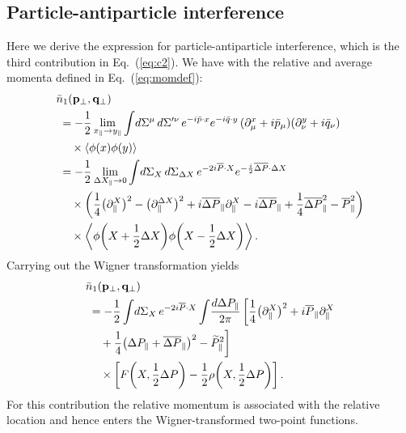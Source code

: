 \documentclass[reprint,superscriptaddress,english,preprintnumbers,amsmath,amssymb,aps,prx]{revtex4-2}
\def\Eq#1{Eq.~(\ref{#1})}
\begin{document}
\begin{appendix}


\section{Particle-antiparticle interference}\label{app:pai}

Here we derive the expression for particle-antiparticle interference, which is the third contribution in \Eq{eq:c2}. We have with the relative and average momenta defined in \Eq{eq:momdef}:
\begin{align}
\begin{split}
&\bar n_1(\bold{p}_\perp,\bold{q}_\perp)\\
&\;= - \frac{1}{2}\lim_{x_\parallel\rightarrow y_\parallel}\int\!d\Sigma^\mu\,d\Sigma'^\nu\,e^{-i\bar p \cdot x}e^{-i\bar q \cdot y}\,(\partial_{\mu}^x+i\bar p_\mu)(\partial_{\nu}^y+i\bar q_\nu)\\
&\;\quad\times \langle \phi(x)\phi(y)\rangle\\
%
&\;=- \frac{1}{2}\lim_{\Delta X_\parallel \rightarrow 0}\int\!d\Sigma_X\,d\Sigma_{\Delta X}\,e^{-2i\overline{P}\cdot  X}e^{-\frac{i}{2}\overline{\Delta P} \cdot \Delta X}\\
&\;\quad \times\bigg(\frac{1}{4}\big(\partial_{\parallel}^X\big)^2-\big(\partial^{\Delta X}_\parallel \big)^2 +i\overline{\Delta P}_\parallel \partial_{\parallel}^X -i \overline{\Delta P}_\parallel +\frac{1}{4}\overline{\Delta P}_\parallel^2 - \overline{P}_\parallel^2  \bigg)\\
&\;\quad\times\bigg\langle \phi\bigg(X+\frac{1}{2}\Delta X\bigg)\phi\bigg(X-\frac{1}{2}\Delta X\bigg)\bigg\rangle\,.
\end{split}
\end{align}
Carrying out the Wigner transformation yields
\begin{align}\label{eq:as}
\begin{split}
&\bar n_1(\bold{p}_\perp,\bold{q}_\perp)\\
&\;= -\frac{1}{2}\int\!d\Sigma_X\, e^{-2i\overline{P}\cdot  X} \int\!\frac{d\Delta P_\parallel}{2\pi}\, \bigg[ \frac{1}{4}\big(\partial_{\parallel}^X\big)^2 +i\overline{P}_\parallel \partial_{\parallel}^X\\
&\;\quad +\frac{1}{4}\big(\Delta P_\parallel + \overline{\Delta P}_\parallel  \big)^2 - \widetilde P_\parallel^2\bigg]\\
&\;\quad\times\bigg[F\bigg(X,\frac{1}{2}\Delta P\bigg) - \frac{1}{2}\rho\bigg( X,\frac{1}{2}\Delta P \bigg)\bigg]\,.
\end{split}
\end{align}
For this contribution the relative momentum is associated with the relative location and hence enters the Wigner-transformed two-point functions.


\end{appendix}
\end{document}
